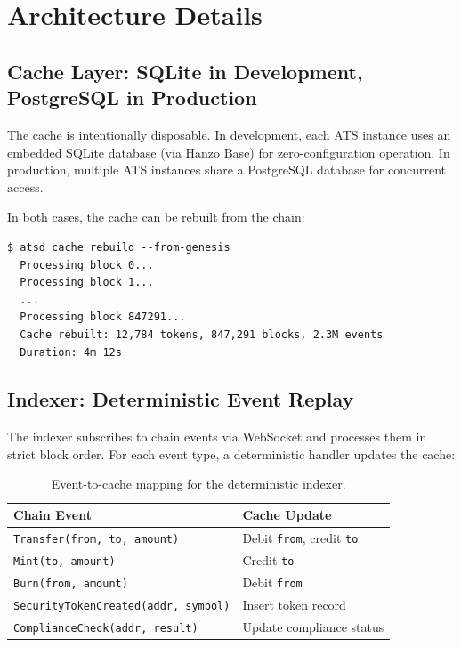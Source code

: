 \section{Architecture Details}

\label{sec:architecture}

\subsection{Cache Layer: SQLite in Development, PostgreSQL in Production}

The cache is intentionally disposable.  In development, each ATS
instance uses an embedded SQLite database (via Hanzo Base) for
zero-configuration operation.  In production, multiple ATS instances
share a PostgreSQL database for concurrent access.

In both cases, the cache can be rebuilt from the chain:

\begin{verbatim}
$ atsd cache rebuild --from-genesis
  Processing block 0...
  Processing block 1...
  ...
  Processing block 847291...
  Cache rebuilt: 12,784 tokens, 847,291 blocks, 2.3M events
  Duration: 4m 12s
\end{verbatim}

\subsection{Indexer: Deterministic Event Replay}

The indexer subscribes to chain events via WebSocket and processes
them in strict block order.  For each event type, a deterministic
handler updates the cache:

\begin{table}[h]
\centering
\begin{tabular}{ll}
\toprule
\textbf{Chain Event} & \textbf{Cache Update} \\
\midrule
\texttt{Transfer(from, to, amount)} & Debit \texttt{from}, credit
  \texttt{to} \\
\texttt{Mint(to, amount)} & Credit \texttt{to} \\
\texttt{Burn(from, amount)} & Debit \texttt{from} \\
\texttt{SecurityTokenCreated(addr, symbol)} & Insert token record \\
\texttt{ComplianceCheck(addr, result)} & Update compliance status \\
\bottomrule
\end{tabular}
\caption{Event-to-cache mapping for the deterministic indexer.}
\label{tab:events}
\end{table}


